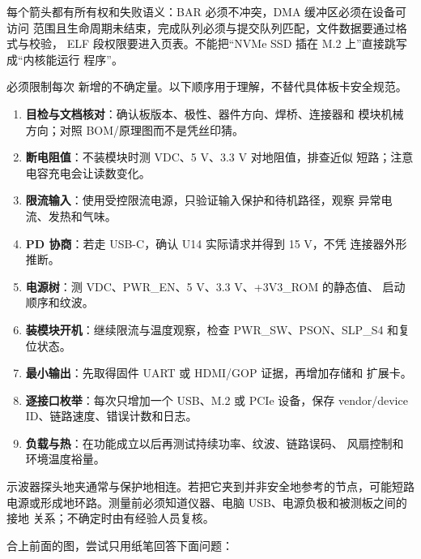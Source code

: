 每个箭头都有所有权和失败语义：BAR 必须不冲突，DMA 缓冲区必须在设备可访问
范围且生命周期未结束，完成队列必须与提交队列匹配，文件数据要通过格式与校验，
ELF 段权限要进入页表。不能把“NVMe SSD 插在 M.2 上”直接跳写成“内核能运行
程序”。

必须限制每次
新增的不确定量。以下顺序用于理解，不替代具体板卡安全规范。

\begin{enumerate}[leftmargin=2em]
  \item \textbf{目检与文档核对}：确认板版本、极性、器件方向、焊桥、连接器和
        模块机械方向；对照 BOM/原理图而不是凭丝印猜。
  \item \textbf{断电阻值}：不装模块时测 VDC、5 V、3.3 V 对地阻值，排查近似
        短路；注意电容充电会让读数变化。
  \item \textbf{限流输入}：使用受控限流电源，只验证输入保护和待机路径，观察
        异常电流、发热和气味。
  \item \textbf{PD 协商}：若走 USB-C，确认 U14 实际请求并得到 15 V，不凭
        连接器外形推断。
  \item \textbf{电源树}：测 VDC、PWR\_EN、5 V、3.3 V、+3V3\_ROM 的静态值、
        启动顺序和纹波。
  \item \textbf{装模块开机}：继续限流与温度观察，检查 PWR\_SW、PSON、SLP\_S4
        和复位状态。
  \item \textbf{最小输出}：先取得固件 UART 或 HDMI/GOP 证据，再增加存储和
        扩展卡。
  \item \textbf{逐接口枚举}：每次只增加一个 USB、M.2 或 PCIe 设备，保存
        vendor/device ID、链路速度、错误计数和日志。
  \item \textbf{负载与热}：在功能成立以后再测试持续功率、纹波、链路误码、
        风扇控制和环境温度裕量。
\end{enumerate}

\begin{failurebox}
示波器探头地夹通常与保护地相连。若把它夹到并非安全地参考的节点，可能短路
电源或形成地环路。测量前必须知道仪器、电脑 USB、电源负极和被测板之间的接地
关系；不确定时由有经验人员复核。
\end{failurebox}

合上前面的图，尝试只用纸笔回答下面问题：

